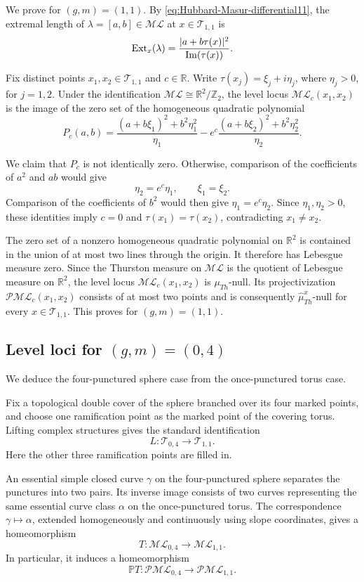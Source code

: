 \documentclass[dvipdfmx]{amsart}
\theoremstyle{remark}
\newcommand{\ext}{{\rm Ext}}
\newcommand{\teich}{\mathcal{T}}
\newcommand{\ThursM}{\mu_{Th}}
\newcommand{\PThursM}{\hat{\mu}_{Th}}
\newcommand{\ml}{\mathcal{ML}}
\newcommand{\pml}{\mathcal{PML}}
\begin{document}
We prove  for $(g,m)=(1,1)$.
By \eqref{eq:Hubbard-Masur-differential11}, the extremal length
of $\lambda=[a,b]\in\ml$ at $x\in\teich_{1,1}$ is
\begin{equation}
\label{eq:extremal_length-formula11}
\ext_x(\lambda)
=\frac{|a+b\tau(x)|^2}{\operatorname{Im}(\tau(x))}.
\end{equation}

Fix distinct points $x_1,x_2\in\teich_{1,1}$ and $c\in\mathbb R$.
Write $\tau(x_j)=\xi_j+i\eta_j$, where $\eta_j>0$, for $j=1,2$.
Under the identification
$\ml\cong\mathbb R^2/\mathbb Z_2$,
the level locus $\ml_c(x_1,x_2)$ is the image of the zero set
of the homogeneous quadratic polynomial
\[
P_c(a,b)
=
\frac{(a+b\xi_1)^2+b^2\eta_1^2}{\eta_1}
-
e^c\frac{(a+b\xi_2)^2+b^2\eta_2^2}{\eta_2}.
\]

We claim that $P_c$ is not identically zero.
Otherwise, comparison of the coefficients of $a^2$ and $ab$
would give
\[
\eta_2=e^c\eta_1,
\qquad
\xi_1=\xi_2.
\]
Comparison of the coefficients of $b^2$ would then give
$\eta_1=e^c\eta_2$.
Since $\eta_1,\eta_2>0$, these identities imply $c=0$
and $\tau(x_1)=\tau(x_2)$, contradicting $x_1\ne x_2$.

The zero set of a nonzero homogeneous quadratic polynomial
on $\mathbb R^2$ is contained in the union of at most two
lines through the origin.
It therefore has Lebesgue measure zero.
Since the Thurston measure on $\ml$ is the quotient
of Lebesgue measure on $\mathbb R^2$,
the level locus $\ml_c(x_1,x_2)$ is $\ThursM$-null.
Its projectivization $\pml_c(x_1,x_2)$ consists of at most
two points and is consequently $\PThursM^x$-null
for every $x\in\teich_{1,1}$.
This proves  for $(g,m)=(1,1)$.

\subsection{Level loci for $(g,m)=(0,4)$}

We deduce the four-punctured sphere case from the
once-punctured torus case.

Fix a topological double cover of the sphere
branched over its four marked points, and choose
one ramification point as the marked point of
the covering torus.
Lifting complex structures gives the standard
identification
\[
L\colon\teich_{0,4}\longrightarrow\teich_{1,1}.
\]
Here the other three ramification points are
filled in.

An essential simple closed curve $\gamma$ on
the four-punctured sphere separates the punctures
into two pairs.
Its inverse image consists of two curves
representing the same essential curve class
$\alpha$ on the once-punctured torus.
The correspondence $\gamma\mapsto\alpha$, extended
homogeneously and continuously using slope
coordinates, gives a homeomorphism
\[
T\colon\ml_{0,4}\longrightarrow\ml_{1,1}.
\]
In particular, it induces a homeomorphism
\[
\mathbb P T\colon\pml_{0,4}\longrightarrow\pml_{1,1}.
\]
\end{document}
